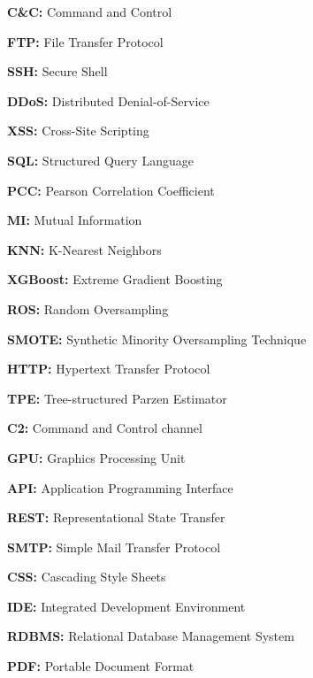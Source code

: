\textbf{C\&C:} Command and Control

\vskip0.7cm

\textbf{FTP:} File Transfer Protocol

\vskip0.7cm

\textbf{SSH:} Secure Shell

\vskip0.7cm

\textbf{DDoS:} Distributed Denial-of-Service

\vskip0.7cm

\textbf{XSS:} Cross-Site Scripting

\vskip0.7cm

\textbf{SQL:} Structured Query Language

\vskip0.7cm

\textbf{PCC:} Pearson Correlation Coefficient

\vskip0.7cm

\textbf{MI:} Mutual Information

\vskip0.7cm

\textbf{KNN:} K-Nearest Neighbors

\vskip0.7cm

\textbf{ XGBoost:} Extreme Gradient Boosting

\vskip0.7cm

\textbf{ROS:} Random Oversampling

\vskip0.7cm

\textbf{SMOTE:} Synthetic Minority Oversampling Technique

\vskip0.7cm

\textbf{HTTP:} Hypertext Transfer Protocol

\vskip0.7cm

\textbf{TPE:} Tree-structured Parzen Estimator

\vskip0.7cm

\textbf{C2:} Command and Control channel

\vskip0.7cm

\textbf{GPU:} Graphics Processing Unit

\vskip0.7cm

\textbf{API:} Application Programming Interface

\vskip0.7cm

\textbf{REST:} Representational State Transfer

\vskip0.7cm

\textbf{SMTP:} Simple Mail Transfer Protocol

\vskip0.7cm

\textbf{CSS:} Cascading Style Sheets

\vskip0.7cm

\textbf{IDE:} Integrated Development Environment

\vskip0.7cm

\textbf{RDBMS:} Relational Database Management System

\vskip0.7cm

\textbf{PDF:} Portable Document Format

\endgroup